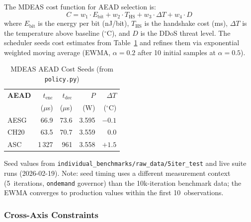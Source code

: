 The MDEAS cost function for AEAD selection is:
\begin{equation}
C = w_1 \cdot E_\text{bit} + w_2 \cdot T_\text{HS}
  + w_3 \cdot \Delta T + w_4 \cdot D
\label{eq:cost}
\end{equation}
where $E_\text{bit}$ is the energy per bit (nJ/bit), $T_\text{HS}$ is the
handshake cost (ms), $\Delta T$ is the temperature above baseline
($^\circ$C), and $D$ is the DDoS threat level.  The scheduler seeds
cost estimates from Table~\ref{tab:aead_seeds} and refines them via
exponential weighted moving average (EWMA, $\alpha = 0.2$ after 10
initial samples at $\alpha = 0.5$).

\begin{table}[t]
\centering
\caption{MDEAS AEAD Cost Seeds (from \texttt{policy.py})}
\label{tab:aead_seeds}
\footnotesize
\begin{tabular}{@{}lrrrr@{}}
\toprule
\textbf{AEAD} &
  \textbf{$t_\text{enc}$} & \textbf{$t_\text{dec}$} &
  \textbf{$P$} & \textbf{$\Delta T$} \\
& ($\mu$s) & ($\mu$s) & (W) & ($^\circ$C) \\
\midrule
AESG & 66.9   & 73.6  & 3.595 & $-0.1$ \\
CH20 & 63.5   & 70.7  & 3.559 & 0.0    \\
ASC  & 1\,327 & 961   & 3.558 & $+1.5$ \\
\bottomrule
\end{tabular}
\begin{tablenotes}
\footnotesize
\item Seed values from \texttt{individual\_benchmarks/raw\_data/5iter\_test}
  and live suite runs (2026-02-19).  Note: seed timing uses a
  different measurement context (5~iterations, \texttt{ondemand}
  governor) than the 10k-iteration benchmark data; the EWMA
  converges to production values within the first 10~observations.
\end{tablenotes}
\end{table}

\subsubsection{Cross-Axis Constraints}


